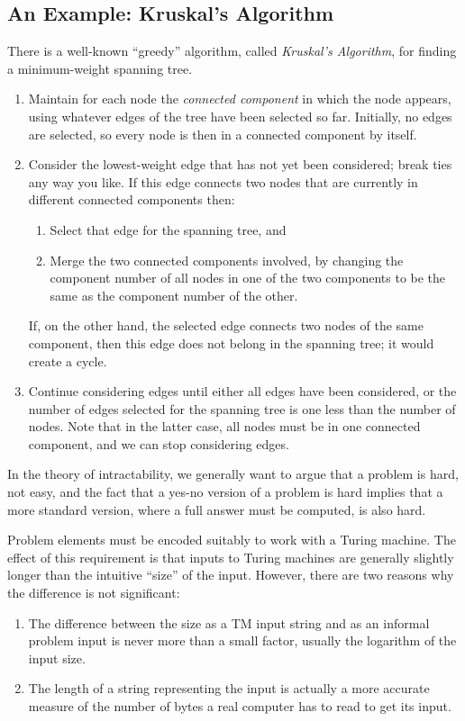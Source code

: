 \documentclass[]{article}
\begin{document}
\subsection*{An Example: Kruskal's Algorithm}
There is a well-known ``greedy'' algorithm, called \emph{Kruskal's Algorithm},
for finding a minimum-weight spanning tree.
\begin{enumerate}
\item Maintain for each node the \emph{connected component} in which the node
appears, using whatever edges of the tree have been selected so far. Initially,
no edges are selected, so every node is then in a connected component by itself.
\item Consider the lowest-weight edge that has not yet been considered; break
ties any way you like. If this edge connects two nodes that are currently in
different connected components then:
\begin{enumerate}
\item Select that edge for the spanning tree, and
\item Merge the two connected components involved, by changing the component
number of all nodes in one of the two components to be the same as the component
number of the other.
\end{enumerate}
If, on the other hand, the selected edge connects two nodes of the same
component, then this edge does not belong in the spanning tree; it would create
a cycle.
\item Continue considering edges until either all edges have been considered, or
the number of edges selected for the spanning tree is one less than the number
of nodes. Note that in the latter case, all nodes must be in one connected
component, and we can stop considering edges.
\end{enumerate}

In the theory of intractability, we generally want to argue that a problem is
hard, not easy, and the fact that a yes-no version of a problem is hard implies
that a more standard version, where a full answer must be computed, is also
hard.

Problem elements must be encoded suitably to work with a Turing machine. The
effect of this requirement is that inputs to Turing machines are generally
slightly longer than the intuitive ``size'' of the input. However, there are two
reasons why the difference is not significant:
\begin{enumerate}
\item The difference between the size as a TM input string and as an informal
problem input is never more than a small factor, usually the logarithm of the
input size.
\item The length of a string representing the input is actually a more accurate
measure of the number of bytes a real computer has to read to get its input.
\end{enumerate}
\end{document}
